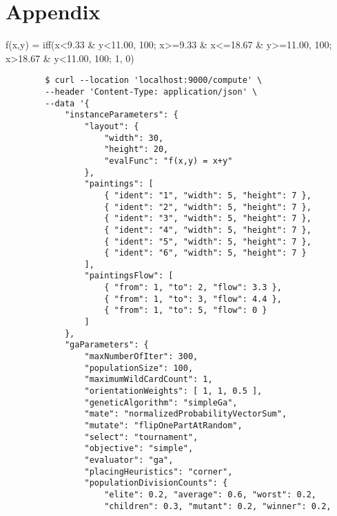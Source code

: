 \chapter{Appendix}\label{ch:appendix}

\begin{listing}[h!]
    f(x,y) = iff(x<9.33 \& y<11.00, 100; x>=9.33 \& x<=18.67 \& y>=11.00, 100; x>18.67 \& y<11.00, 100; 1, 0)
    \caption[Eval function used for biased sparse cluster instance]
    {Eval function used for biased sparse cluster instance in mXparser\footnotemark[1] format.}
    \label{lst:biased-sparse-cluster-eval-function}
\end{listing}


\begin{listing}[h!]
    \centering
    \begin{verbatim}
        $ curl --location 'localhost:9000/compute' \
        --header 'Content-Type: application/json' \
        --data '{
            "instanceParameters": {
                "layout": {
                    "width": 30,
                    "height": 20,
                    "evalFunc": "f(x,y) = x+y"
                },
                "paintings": [
                    { "ident": "1", "width": 5, "height": 7 },
                    { "ident": "2", "width": 5, "height": 7 },
                    { "ident": "3", "width": 5, "height": 7 },
                    { "ident": "4", "width": 5, "height": 7 },
                    { "ident": "5", "width": 5, "height": 7 },
                    { "ident": "6", "width": 5, "height": 7 }
                ],
                "paintingsFlow": [
                    { "from": 1, "to": 2, "flow": 3.3 },
                    { "from": 1, "to": 3, "flow": 4.4 },
                    { "from": 1, "to": 5, "flow": 0 }
                ]
            },
            "gaParameters": {
                "maxNumberOfIter": 300,
                "populationSize": 100,
                "maximumWildCardCount": 1,
                "orientationWeights": [ 1, 1, 0.5 ],
                "geneticAlgorithm": "simpleGa",
                "mate": "normalizedProbabilityVectorSum",
                "mutate": "flipOnePartAtRandom",
                "select": "tournament",
                "objective": "simple",
                "evaluator": "ga",
                "placingHeuristics": "corner",
                "populationDivisionCounts": {
                    "elite": 0.2, "average": 0.6, "worst": 0.2,
                    "children": 0.3, "mutant": 0.2, "winner": 0.2,

\end{verbatim}
\end{listing}
